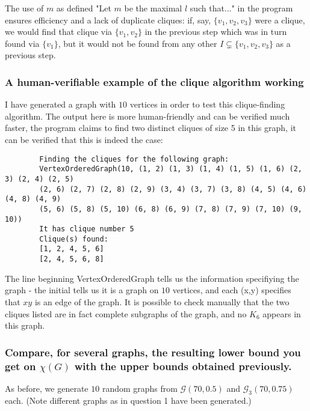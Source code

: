 \documentclass{article}
\newcommand{\programquote}[1]{\fontfamily{pcr}\selectfont 
				#1\normalfont
			}
\begin{document}
The use of $m$ as defined "Let $m$ be the maximal $l$ such that..." in the program ensures efficiency and a lack of duplicate cliques: if, say, $\{ v_1, v_2, v_3\}$ were a clique, we would find that clique via $\{ v_1, v_2\}$ in the previous step which was in turn found via $\{ v_1\}$, but it would not be found from any other $I \subsetneq \{ v_1, v_2, v_3\}$ as a previous step.

\subsubsection{A human-verifiable example of the clique algorithm working}

I have generated a graph with $10$ vertices in order to test this clique-finding algorithm. The output here is more human-friendly and can be verified much faster, the program claims to find two distinct cliques of size 5 in this graph, it can be verified that this is indeed the case:

\begin{tcolorbox}[size=small]
	\begin{verbatim}
		Finding the cliques for the following graph:
		VertexOrderedGraph(10, (1, 2) (1, 3) (1, 4) (1, 5) (1, 6) (2, 3) (2, 4) (2, 5)
		(2, 6) (2, 7) (2, 8) (2, 9) (3, 4) (3, 7) (3, 8) (4, 5) (4, 6) (4, 8) (4, 9)
		(5, 6) (5, 8) (5, 10) (6, 8) (6, 9) (7, 8) (7, 9) (7, 10) (9, 10))
		It has clique number 5
		Clique(s) found:
		[1, 2, 4, 5, 6]
		[2, 4, 5, 6, 8]
	\end{verbatim}
\end{tcolorbox}

The line beginning \programquote{VertexOrderedGraph} tells us the information specifiying the graph - the initial \programquote{10} tells us it is a graph on $10$ vertices, and each \programquote{(x,y)} specifies that $xy$ is an edge of the graph. It is possible to check manually that the two cliques listed are in fact complete subgraphs of the graph, and no $K_6$ appears in this graph.

\subsubsection{Compare, for several graphs, the resulting lower bound you get on $\chi(G)$ with the upper bounds obtained previously.}

As before, we generate $10$ random graphs from $\mathcal{G}(70, 0.5)$ and $\mathcal{G}_3(70, 0.75)$ each. (Note different graphs as in question 1 have been generated.)
\end{document}
